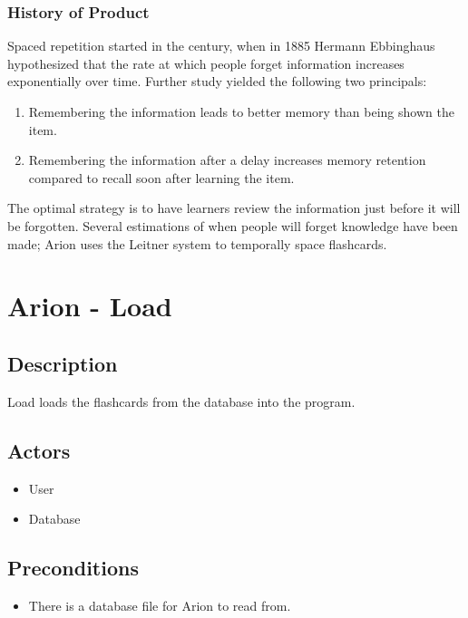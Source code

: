 \documentclass{scrreprt}
\begin{document}
\subsection{History of Product}
Spaced repetition started in the  century, when in 1885 Hermann Ebbinghaus
hypothesized that the rate at which people forget information increases exponentially
over time. Further study yielded the following two principals:
\begin{enumerate}[1.]
    \item Remembering the information leads to better memory than being shown the item.
    \item Remembering the information after a delay increases memory retention compared
        to recall soon after learning the item.
\end{enumerate}
The optimal strategy is to have learners review the information just before it will
be forgotten. Several estimations of when people will forget knowledge have been made;
Arion uses the Leitner system to temporally space flashcards.


\chapter*{Arion - Load}

\section*{Description}
Load loads the flashcards from the database into the program.

\section*{Actors}
\begin{itemize}
    \item User
    \item Database
\end{itemize}

\section*{Preconditions}
\begin{itemize}
    \item There is a database file for Arion to read from.
\end{itemize}
\end{document}
